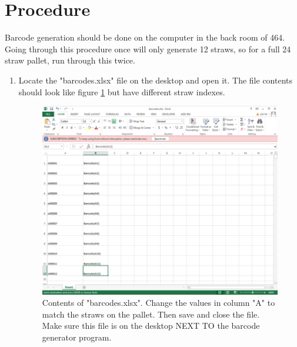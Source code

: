 \documentclass[letterpaper,12pt]{article}
\begin{document}
\section{Procedure}
 Barcode generation should be done on the computer in the back room of 464.  Going through this procedure once will only generate 12 straws, so for a full 24 straw pallet, run through this twice.
\begin{enumerate}
	\item Locate the "barcodes.xlsx" file on the desktop and open it.  The file contents should look like figure \ref{fig:bar} but have different straw indexes.
    
    \begin{figure} [h]
		\centering
		\includegraphics[width=.75\textwidth]{barcodesSOP.png}
		\caption{Contents of "barcodes.xlsx".  Change the values in column "A" to match the straws on the pallet.  Then save and close the file.  Make sure this file is on the desktop NEXT TO the barcode generator program.}
		\label{fig:bar}
	\end{figure}
    

\end{enumerate}
\end{document}
